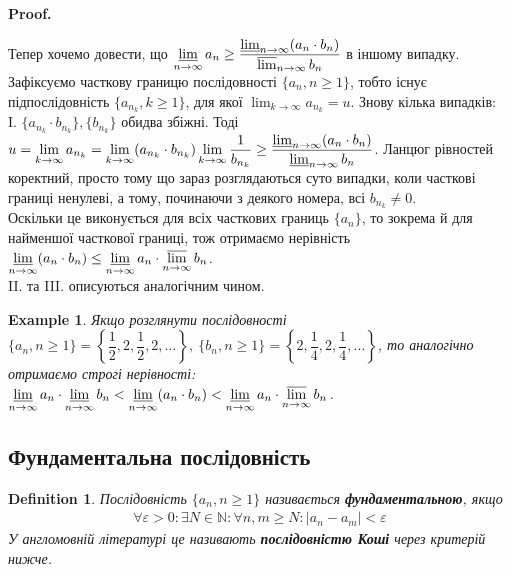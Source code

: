 \documentclass[a4paper, 14pt]{article}
\makeatletter
\def\qed{$\blacksquare$}
\theoremstyle{theoremdd}
\theoremstyle{theoremdd}
\newtheorem{definition}[theorem]{Definition}
\theoremstyle{theoremdd}
\theoremstyle{theoremdd}
\newtheorem{example}[theorem]{Example}
\theoremstyle{theoremdd}
\theoremstyle{theoremdd}
\theoremstyle{theoremdd}
\theoremstyle{theoremdd}
\renewenvironment{proof}[1][Proof.\\]{\par
\pushQED{\hfill \qed}%
\normalfont \topsep6\p@\@plus6\p@\relax
\trivlist
\item\relax
{\bfseries
#1\@addpunct{.}}\hspace\labelsep\ignorespaces
}{%
\popQED\endtrivlist\@endpefalse
}
\makeatother
\begin{document}
\begin{proof}
	Тепер хочемо довести, що $\displaystyle\varliminf_{n \to \infty} a_n \geq \dfrac{\varliminf_{n \to \infty} (a_n \cdot b_n)}{\varlimsup_{n \to \infty} b_n}$ в іншому випадку.\\
	Зафіксуємо часткову границю послідовності $\{a_n, n \geq 1\}$, тобто існує підпослідовність $\{a_{n_k}, k \geq 1\}$, для якої $\displaystyle\lim_{k \to \infty} a_{n_k} = u$. Знову кілька випадків:\\
	I. $\{a_{n_k} \cdot b_{n_k}\}, \{b_{n_k}\}$ обидва збіжні. Тоді $u = \displaystyle\lim_{k \to \infty} a_{n_k} = \lim_{k \to \infty} (a_{n_k} \cdot b_{n_k}) \lim_{k \to \infty} \dfrac{1}{b_{n_k}} \geq \dfrac{\varliminf_{n \to \infty} (a_n \cdot b_n)}{\varliminf_{n \to \infty} b_n}$. Ланцюг рівностей коректний, просто тому що зараз розглядаються суто випадки, коли часткові границі ненулеві, а тому, починаючи з деякого номера, всі $b_{n_k} \neq 0$.\\
	Оскільки це виконується для всіх часткових границь $\{a_n\}$, то зокрема й для найменшої часткової границі, тож отримаємо нерівність $\displaystyle\varliminf_{n \to \infty} (a_n \cdot b_n) \leq \varliminf_{n \to \infty} a_n \cdot \varlimsup_{n \to \infty} b_n$.\\
	II. та III. описуються аналогічним чином.
	\end{proof}
	
	\begin{example}
	Якщо розглянути послідовності $\{a_n, n \geq 1\} = \left\{ \dfrac{1}{2}, 2, \dfrac{1}{2}, 2, \dots \right\},\ \{b_n, n \geq 1\} = \left\{ 2,\dfrac{1}{4},2,\dfrac{1}{4},\dots \right\}$, то аналогічно отримаємо строгі нерівності:\\
	$\displaystyle\varliminf_{n \to \infty} a_n \cdot \varliminf_{n \to \infty} b_n < \varliminf_{n \to \infty} (a_n \cdot b_n) < \varliminf_{n \to \infty} a_n \cdot \varlimsup_{n \to \infty} b_n$.
	\end{example}
		
	\subsection{Фундаментальна послідовність}
	\begin{definition}
	Послідовність $\{a_n, n \geq 1\}$ називається \textbf{фундаментальною}, якщо
	\begin{align*}
	\forall \varepsilon > 0: \exists N \in \mathbb{N}: \forall n,m \geq N: |a_n - a_m| < \varepsilon
	\end{align*}
	У англомовній літературі це називають \textbf{послідовністю Коші} через критерій нижче.
	\end{definition}
	
\end{document}
